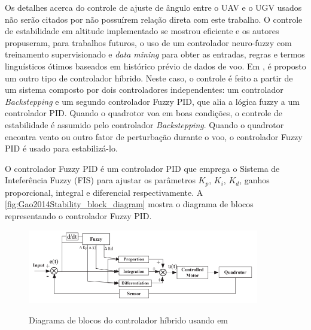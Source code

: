 Os detalhes acerca do controle de ajuste de ângulo entre o UAV e o UGV usados não serão citados por não possuírem relação direta com este trabalho. O controle de estabilidade em altitude implementado se mostrou eficiente e os autores propuseram, para trabalhos futuros, o uso de um controlador neuro-fuzzy com treinamento supervisionado e \textit{data mining} para obter as entradas, regras e termos linguísticos ótimos baseados em histórico prévio de dados de voo.
%
%
%
Em \cite{Gao2014Stability}, é proposto um outro tipo de controlador híbrido. Neste caso, o controle é feito a partir de um sistema composto por dois controladores independentes: um controlador \textit{Backstepping} e um segundo controlador Fuzzy PID, que alia a lógica fuzzy a um controlador PID. Quando o quadrotor voa em boas condições, o controle de estabilidade é assumido pelo controlador \textit{Backstepping}. Quando o quadrotor encontra vento ou outro fator de perturbação durante o voo, o controlador Fuzzy PID é usado para estabilizá-lo.

O controlador Fuzzy PID é um controlador PID que emprega o Sistema de Inteferência Fuzzy (FIS) para ajustar os parâmetros $K_p$, $K_i$, $K_d$, ganhos proporcional, integral e diferencial respectivamente. A \autoref{fig:Gao2014Stability_block_diagram} mostra o diagrama de blocos representando o controlador Fuzzy PID.

\begin{figure}[!htb]
    \centering
    \caption{Diagrama de blocos do controlador híbrido usando em \cite{Gao2014Stability}}
    \includegraphics[width=0.9\textwidth]{./04-figuras/Gao2014Stability_block_diagram}
    \label{fig:Gao2014Stability_block_diagram}
\end{figure}

